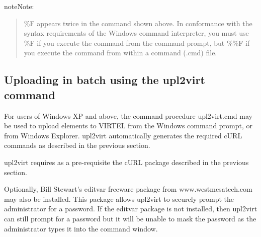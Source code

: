 \documentclass[letterpaper,10pt,english]{sphinxmanual}
\begin{document}
\begin{sphinxadmonition}{note}{Note:}\begin{quote}

\%F appears twice in the command shown above. In conformance with the syntax requirements of the Windows command interpreter, you must use \%F if you execute the command from the command prompt, but \%\%F if you execute the command from within a command (.cmd) file.
\end{quote}

\ignorespaces \end{sphinxadmonition}

\ignorespaces 

\subsection{Uploading in batch using the upl2virt command}
\label{\detokenize{audit_operations_ and_performance:uploading-in-batch-using-the-upl2virt-command}}\label{\detokenize{audit_operations_ and_performance:index-65}}
For users of Windows XP and above, the command procedure upl2virt.cmd may be used to upload elements to VIRTEL from the Windows command prompt, or from Windows Explorer. upl2virt automatically generates the required cURL commands as described in the previous section.


upl2virt requires as a pre-requisite the cURL package described in the previous section.

Optionally, Bill Stewart’s editvar freeware package from www.westmesatech.com may also be installed. This package allows upl2virt to securely prompt the administrator for a password. If the editvar package is not installed, then upl2virt can still prompt for a password but it will be unable to mask the password as the administrator types it into
the command window.
\end{document}
